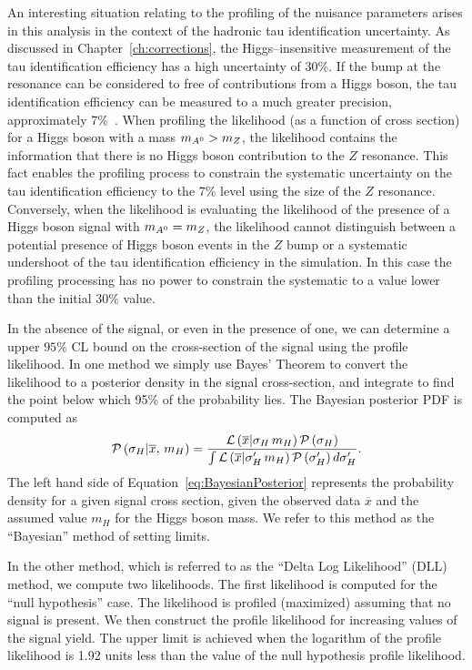 An interesting situation relating to the profiling of the nuisance parameters
arises in this analysis in the context of the hadronic tau identification
uncertainty.  As discussed in Chapter~\ref{ch:corrections}, the
Higgs--insensitive measurement of the tau identification efficiency has a high
uncertainty of 30\%.  If the bump at the \ZTT resonance can be considered to
free of contributions from a Higgs boson, the tau identification efficiency can be measured to a much greater
precision, approximately 7\%~\cite{CMS-PAS-EWK-10-013, CMS-PAS-TAU-11-001}.
When profiling the likelihood (as a function of cross section) for a Higgs boson with
a mass $m_{A^0} > m_Z$, the likelihood contains the information that there is no
Higgs boson
contribution to the $Z$ resonance.  This fact enables the profiling
process to constrain the systematic uncertainty on the tau identification
efficiency to the 7\% level using the size of the $Z$ resonance.  Conversely,
when the likelihood is evaluating the likelihood of the presence of a Higgs
boson
signal with $m_{A^0} = m_Z$, the likelihood cannot distinguish between a potential
presence of Higgs boson events in the $Z$ bump or a systematic undershoot of the tau
identification efficiency in the simulation.  In this case the profiling
processing has no power to constrain the systematic to a value lower than the
initial 30\% value.

In the absence of the signal, or even in the presence of one, we can
determine a upper $95\%$ CL bound on the cross-section of the signal using
the profile likelihood.  In one method we simply use Bayes' Theorem to
convert the likelihood to a posterior density in the signal
cross-section, and integrate to find the point below which 95\% of the
probability lies.  The Bayesian posterior PDF is computed as
\begin{equation}
  {\cal P}\left( \sigma_H \vert \overline x, \, m_H \right) = 
  \frac
  {{\cal L}\left( \overline x \vert \sigma_{H} \, m_H \right) {\cal P}\left( \sigma_H \right)}
  {\int {\cal L}\left( \overline x \vert \sigma'_H \, m_H\right) {\cal P}\left(
  \sigma'_H \right) d\sigma'_H }.
  \label{eq:BayesianPosterior}
\end{equation}
The left hand side of Equation~\ref{eq:BayesianPosterior} represents the
probability density for a given signal cross section, given the observed data
$\overline x$ and the assumed value $m_H$ for the Higgs boson mass.  We refer to this
method as the ``Bayesian'' method of setting limits.

In the other method, which is referred to as the ``Delta Log Likelihood'' (DLL)
method, we compute two likelihoods.  The first likelihood is computed for the
``null hypothesis'' case.  The likelihood is profiled (maximized) assuming that
no signal is present.  We then construct the profile likelihood for increasing
values of the signal yield.  The upper limit is achieved when the logarithm of
the profile likelihood is 1.92 units less than the value of the null hypothesis
profile likelihood.  

